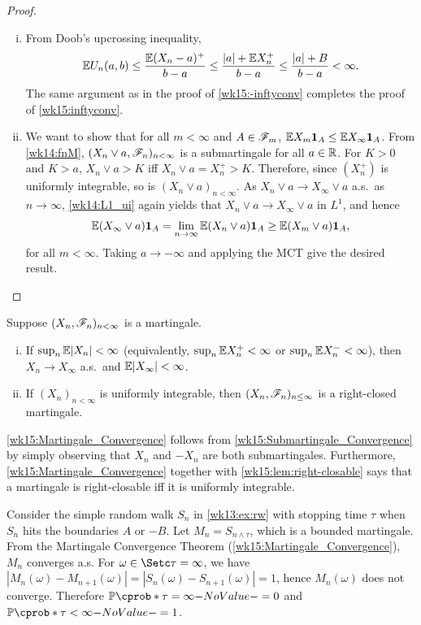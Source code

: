 \documentclass[12pt]{article}
\begin{document}
\begin{proof}
\begin{enumerate}[(i)]
	\item From Doob's upcrossing inequality, 
	\begin{align*}
	\E U_n(a,b) \leq \frac{\E(X_n-a)^+}{b-a}  \leq \frac{|a|+\E X_n^+}{b-a} \leq \frac{|a|+B}{b-a} <\infty.
	\end{align*}
	The same argument as in the proof of \cref{wk15:-inftyconv} completes the proof of \cref{wk15:inftyconv}.
	
	\item We want to show that for all $m<\infty$ and $A\in\mathscr{F}_m$, $\E X_m\indicatore{A} \leq \E X_\infty\indicatore{A}$. From \cref{wk14:fnM}, $(X_n\vee a, \mathscr{F}_n)_{n<\infty}$ is a submartingale for all $a\in\mathbb{R}$. For $K>0$ and $K>a$, $X_n\vee a > K$ iff $X_n\vee a = X_n^+ >K$. Therefore, since $(X_n^+)$ is uniformly integrable, so is $(X_n\vee a)_{n<\infty}$. As $X_n\vee a \to X_{\infty}\vee a$ a.s.\ as $n\to\infty$, \cref{wk14:L1_ui} again yields that $X_n\vee a \to X_{\infty}\vee a$ in $L^1$, and hence
	\begin{align*}
	\E (X_{\infty}\vee a)\indicatore{A} = \lim_{n\to\infty} \E (X_n\vee a)\indicatore{A} \geq \E(X_m\vee a)\indicatore{A},
	\end{align*}
	for all $m<\infty$. Taking $a\to-\infty$ and applying the MCT give the desired result. 
\end{enumerate}
\end{proof}

\begin{Corollary}\label{wk15:Martingale_Convergence}
Suppose $(X_n,\mathscr{F}_n)_{n<\infty}$ is a martingale.
\begin{enumerate}[(i)]
	\item If $\sup_n \E|X_n| <\infty$ (equivalently, $\sup_n \E X_n^+ <\infty$ or $\sup_n \E X_n^- <\infty$), then $X_n\to X_\infty$ a.s.\ and $\E|X_\infty| < \infty$.
	\item If $(X_n)_{n<\infty}$ is uniformly integrable, then $(X_n,\mathscr{F}_n)_{n\leq\infty}$ is a right-closed martingale.
\end{enumerate}
\end{Corollary}
\cref{wk15:Martingale_Convergence} follows from \cref{wk15:Submartingale_Convergence} by simply observing that $X_n$ and $-X_n$ are both submartingales. Furthermore, \cref{wk15:Martingale_Convergence} together with \cref{wk15:lem:right-closable} says that a martingale is right-closable iff it is uniformly integrable. 

\begin{Example}\label{wk15:ex:rw}
Consider the simple random walk $S_n$ in \cref{wk13:ex:rw} with stopping time $\tau$ when $S_n$ hits the boundaries $A$ or $-B$. Let $M_n=S_{n\wedge\tau}$, which is a bounded martingale. From the Martingale Convergence Theorem (\cref{wk15:Martingale_Convergence}), $M_n$ converges a.s. For $\omega\in\set{\tau=\infty}$, we have $|M_n(\omega)-M_{n+1}(\omega)| = |S_n(\omega)-S_{n+1}(\omega)|=1$, hence $M_n(\omega)$ does not converge. Therefore $\P(\tau=\infty)=0$ and $\P(\tau<\infty)=1$.
\end{Example}
\end{document}
